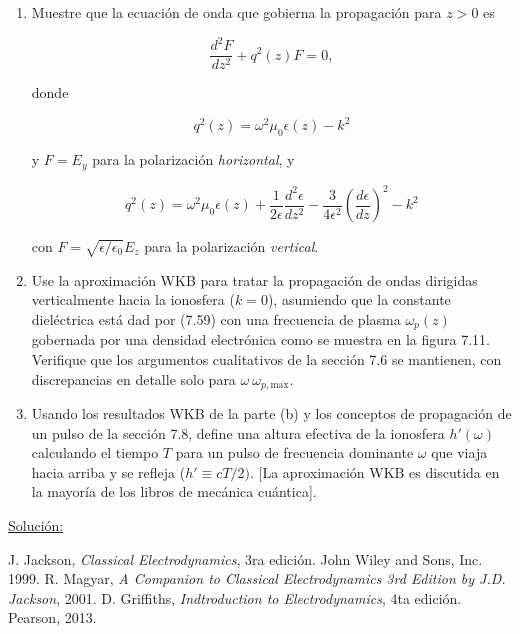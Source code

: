 \documentclass[a4paper,11pt]{article}
\numberwithin{equation}{section}
\begin{document}
\begin{enumerate}[label=\textbf{(\alph*)}]
 \item Muestre que la ecuación de onda que gobierna la propagación para $z > 0$ 
 es 
 
 $$
 \frac{d^2 F}{dz^2} + q^2(z) F = 0,
 $$
 
 donde 
 
 $$
 q^2(z) = \omega^2 \mu_0 \epsilon(z) - k^2
 $$
 
 y $F = E_y$ para la polarización \emph{horizontal}, y 
 
 $$
 q^2(z) = \omega^2 \mu_0 \epsilon(z) + \frac{1}{2\epsilon}\frac{d^2 \epsilon}{dz^2} 
 - \frac{3}{4\epsilon^2}\left(\frac{d \epsilon}{d z} \right)^2 - k^2
 $$
 
 con $F = \sqrt{\epsilon/\epsilon_0}E_z$ para la polarización \emph{vertical}.
 
 \item Use la aproximación WKB para tratar la propagación de ondas dirigidas 
 verticalmente hacia la ionosfera ($k = 0$), asumiendo que la constante dieléctrica 
 está dad por (7.59) con una frecuencia de plasma $\omega_p(z)$ gobernada por una 
 densidad electrónica como se muestra en la figura 7.11. Verifique que los argumentos 
 cualitativos de la sección 7.6 se mantienen, con discrepancias en detalle solo 
 para $\omega ~ \omega_{p,\text{max}}$.
 
 \item Usando los resultados WKB de la parte (b) y los conceptos de propagación 
 de un pulso de la sección 7.8, define una altura efectiva de la ionosfera $h'(\omega)$ 
 calculando el tiempo $T$ para un pulso de frecuencia dominante $\omega$ que viaja 
 hacia arriba y se refleja ($h' \equiv cT/2)$. [La aproximación WKB es discutida 
 en la mayoría de los libros de mecánica cuántica].
\end{enumerate}

\vspace{.3cm}

\underline{Solución:} \vspace{.3cm}

\newpage

\begin{thebibliography}{10}
J. Jackson, \emph{Classical Electrodynamics}, 3ra edición. John Wiley and Sons, Inc. 
1999.
R. Magyar, \emph{A Companion to Classical Electrodynamics 3rd Edition by J.D. 
Jackson}, 2001.
D. Griffiths, \emph{Indtroduction to Electrodynamics}, 4ta edición. Pearson, 2013.
\end{thebibliography}
\end{document}
